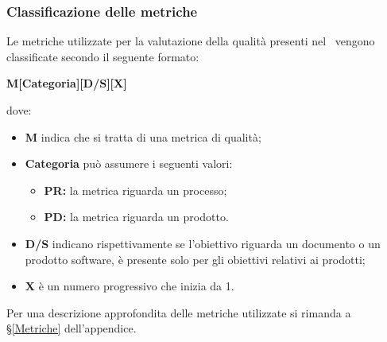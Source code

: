 \subsubsection{Classificazione delle metriche}\label{ClassificazioneMetriche}
Le metriche utilizzate per la valutazione della qualità presenti nel \ vengono classificate secondo il seguente formato:
\begin{center}
	\textbf{M[Categoria][D/S][X]}
\end{center}
dove: 
\begin{itemize}
	\item \textbf{M} indica che si tratta di una metrica di qualità;
	\item \textbf{Categoria} può assumere i seguenti valori:
	\begin{itemize}
		\item \textbf{PR:} la metrica riguarda un processo;
		\item \textbf{PD:} la metrica riguarda un prodotto.
	\end{itemize}
	\item \textbf{D/S} indicano rispettivamente se l'obiettivo riguarda un documento o un prodotto software, è presente solo per gli obiettivi relativi ai prodotti;
	\item \textbf{X} è un numero progressivo che inizia da 1.
\end{itemize}
Per una descrizione approfondita delle metriche utilizzate si rimanda a \S\ref{Metriche} dell'appendice.